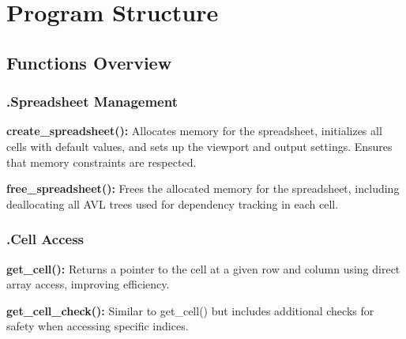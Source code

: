 \documentclass{styles}
\begin{document}
\section*{\fontsize{14.5}{11} \selectfont Program Structure}

\vspace{-2mm} %
\subsection*{\fontsize{14}{11} \selectfont Functions Overview}

\vspace{-0.25mm} %
\subsubsection*{\fontsize{14}{11} \selectfont .Spreadsheet Management}

\noindent
{\fontsize{14pt}{11pt} \selectfont \textbf{create\_spreadsheet():}}  
{\fontsize{14pt}{11pt} \selectfont Allocates memory for the spreadsheet, initializes all cells with default values, and sets up the viewport and output settings. Ensures that memory constraints are respected.}

\vspace{3pt} %

\noindent
{\fontsize{14pt}{11pt} \selectfont \textbf{free\_spreadsheet():}}  
{\fontsize{14pt}{11pt} \selectfont Frees the allocated memory for the spreadsheet, including deallocating all AVL trees used for dependency tracking in each cell.}

\newpage

\subsubsection*{\fontsize{14}{11} \selectfont .Cell Access}

\noindent
{\fontsize{14pt}{11pt} \selectfont \textbf{get\_cell():}}  
{\fontsize{14pt}{11pt} \selectfont  Returns a pointer to the cell at a given row and column using direct array access, improving efficiency.}

\vspace{3pt} %

\noindent
{\fontsize{14pt}{11pt} \selectfont \textbf{get\_cell\_check():}}  
{\fontsize{14pt}{11pt} \selectfont Similar to get\_cell() but includes additional checks for safety when accessing specific indices.}
\end{document}
